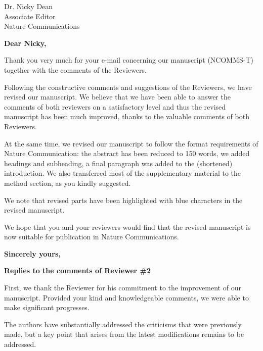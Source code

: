 \documentclass[a4paper, rebuttal, parskip=true, firsthead=false, fromemail=true, foldmarks=false]{scrlttr2}
\begin{document}
 
\begin{letter}{Dr. Nicky Dean\\
Associate Editor\\
Nature Communications}
\opening{\bf Dear Nicky,}

Thank you very much for your e-mail concerning our manuscript (NCOMMS\nobreakdash-T) together with the comments of the Reviewers. 

Following the constructive comments and suggestions of the Reviewers, we have revised our manuscript. 
We believe that we have been able to answer the comments of both reviewers on a satisfactory level and thus the revised manuscript has been much improved, thanks to the valuable comments of both Reviewers. 

At the same time, we revised our manuscript to follow the format requirements of Nature Communication: the abstract has been reduced to 150 words, we added headings and subheading, a final paragraph was added to the (shortened) introduction. We also transferred most of the supplementary material to the method section, as you kindly suggested.

We note that revised parts have been highlighted with blue characters in the revised manuscript. 

We hope that you and your reviewers would find that the revised manuscript is now suitable for publication in Nature Communications. 

\closing{\bf Sincerely yours,} 
\clearpage

\textsf{\textbf{Replies to the comments of Reviewer \#2}}

First, we thank the Reviewer for his commitment to the improvement of our manuscript. Provided your kind and knowledgeable comments, we were able to make significant progresses.

\begin{quotationi}
The authors have substantially addressed the criticisms that were previously made, but a key point that arises from the latest modifications remains to be addressed.


\end{quotationi}
\end{letter}
\end{document}
